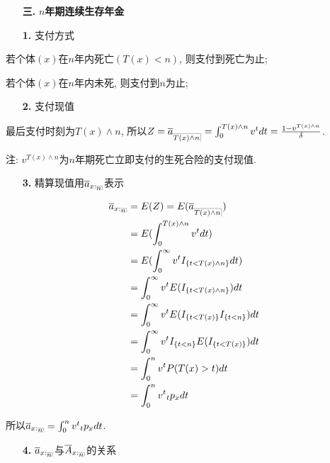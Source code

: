 \documentclass[a4paper,10pt]{ctexbook}
\makeatletter
\newcommand{\hei}{\CJKfamily{hei}}      %
\DeclareRobustCommand{\annu}[1]{_{%
    \def\arraystretch{0}%
    \setlength\arraycolsep{1pt}%
    \setlength\arrayrulewidth{.2pt}%
    \begin{array}[b]{@{}c|}\hline
        \\[\arraycolsep]%
        \scriptstyle #1%
    \end{array}%
}}
\makeatother
\begin{document}
\begin{itemize}
    \item[{\bf\hei 三.}]{\bf\hei $n$年期连续生存年金}
\end{itemize}

\begin{itemize}
    \item[{\bf\hei 1.}] 支付方式
\end{itemize}

若个体$(x)$在$n$年内死亡$(T(x)<n)$, 则支付到死亡为止;

若个体$(x)$在$n$年内未死, 则支付到$n$为止;

\begin{itemize}
    \item[{\bf\hei 2.}] 支付现值
\end{itemize}

最后支付时刻为$T(x)\wedge n$, 所以$Z = \overline{a}_{\annu{T(x)\wedge n}} = \int_0^{T(x)\wedge n} v^tdt = \frac{1-v^{T(x)\wedge n}}{\delta}$.

注: $v^{T(x)\wedge n}$为$n$年期死亡立即支付的生死合险的支付现值.
\begin{itemize}
    \item[{\bf\hei 3.}] 精算现值用$\overline{a}_{x:\annu{n}}$表示
\end{itemize}

\begin{align*}
    \overline{a}_{x:\annu{n}} & = E(Z)=E(\overline{a}_{\annu{T(x)\wedge n}})           \\
                              & = E(\int_0^{T(x)\wedge n} v^tdt)                       \\
                              & = E(\int_0^{\infty} v^tI_{\{t < T(x)\wedge n\}}dt)     \\
                              & = \int_0^{\infty} v^tE(I_{\{t < T(x)\wedge n\}})dt     \\
                              & = \int_0^{\infty} v^tE(I_{\{t< T(x)\} } I_{\{t<n\}})dt \\
                              & = \int_0^{\infty} v^tI_{\{t<n\}} E(I_{\{t< T(x)\} })dt \\
                              & = \int_0^{n} v^tP(T(x) >t )dt                          \\
                              & = \int_0^{n} v^t{}_{t}p_xdt
\end{align*}

所以$\overline{a}_{x:\annu{n}}= \int_0^{n} v^t{}_{t}p_xdt$.
\begin{itemize}
    \item[{\bf\hei 4.}] $\overline{a}_{x:\annu{n}}$与$\overline{A}_{x:\annu{n}}$的关系
\end{itemize}
\end{document}
